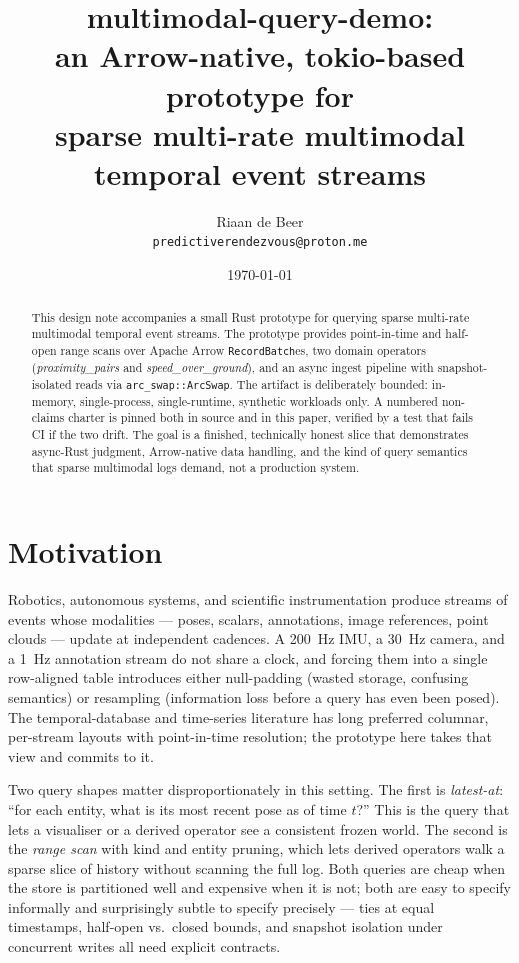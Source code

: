 \documentclass[11pt]{article}
\title{multimodal-query-demo:\\an Arrow-native, tokio-based prototype for\\sparse multi-rate multimodal temporal event streams}
\author{Riaan de Beer\\\texttt{predictiverendezvous@proton.me}}
\date{\today}
\begin{document}
\maketitle

\begin{abstract}
This design note accompanies a small Rust prototype for querying sparse multi-rate
multimodal temporal event streams. The prototype provides point-in-time and half-open
range scans over Apache Arrow \texttt{RecordBatch}es, two domain operators
(\emph{proximity\_pairs} and \emph{speed\_over\_ground}), and an async ingest pipeline
with snapshot-isolated reads via \texttt{arc\_swap::ArcSwap}. The artifact is
deliberately bounded: in-memory, single-process, single-runtime, synthetic workloads
only. A numbered non-claims charter is pinned both in source and in this paper, verified
by a test that fails CI if the two drift. The goal is a finished, technically honest
slice that demonstrates async-Rust judgment, Arrow-native data handling, and the kind of
query semantics that sparse multimodal logs demand, not a production system.
\end{abstract}

\section{Motivation}

Robotics, autonomous systems, and scientific instrumentation produce streams of events
whose modalities --- poses, scalars, annotations, image references, point clouds ---
update at independent cadences. A 200~Hz IMU, a 30~Hz camera, and a 1~Hz annotation
stream do not share a clock, and forcing them into a single row-aligned table introduces
either null-padding (wasted storage, confusing semantics) or resampling (information
loss before a query has even been posed). The temporal-database and time-series
literature has long preferred columnar, per-stream layouts with point-in-time
resolution; the prototype here takes that view and commits to it.

Two query shapes matter disproportionately in this setting. The first is
\emph{latest-at}: ``for each entity, what is its most recent pose as of time $t$?''
This is the query that lets a visualiser or a derived operator see a consistent frozen
world. The second is the \emph{range scan} with kind and entity pruning, which lets
derived operators walk a sparse slice of history without scanning the full log. Both
queries are cheap when the store is partitioned well and expensive when it is not; both
are easy to specify informally and surprisingly subtle to specify precisely --- ties at
equal timestamps, half-open vs.\ closed bounds, and snapshot isolation under concurrent
writes all need explicit contracts.
\end{document}
